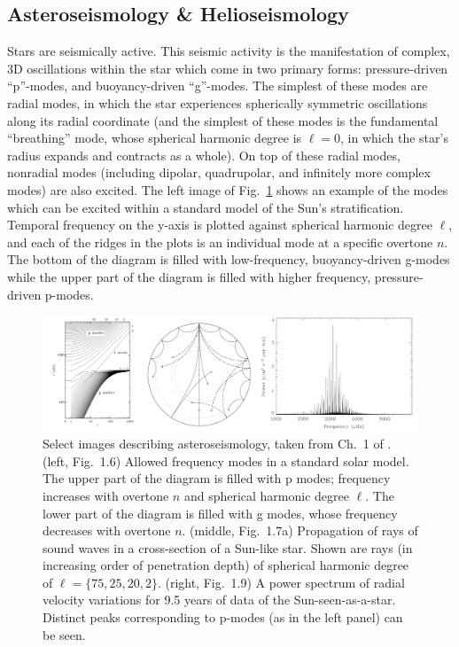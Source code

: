 \subsection{Asteroseismology \& Helioseismology}
\label{sct:asteroseismology}
Stars are seismically active.
This seismic activity is the manifestation of complex, 3D oscillations within the star which come in two primary forms: pressure-driven ``p''-modes, and buoyancy-driven ``g''-modes.
The simplest of these modes are radial modes, in which the star experiences spherically symmetric oscillations along its radial coordinate (and the simplest of these modes is the fundamental ``breathing'' mode, whose spherical harmonic degree is $\ell = 0$, in which the star's radius expands and contracts as a whole).
On top of these radial modes, nonradial modes (including dipolar, quadrupolar, and infinitely more complex modes) are also excited.
The left image of Fig.~\ref{fig:asteroseismology} shows an example of the modes which can be excited within a standard model of the Sun's stratification.
Temporal frequency on the y-axis is plotted against spherical harmonic degree $\ell$, and each of the ridges in the plots is an individual mode at a specific overtone $n$.
The bottom of the diagram is filled with low-frequency, buoyancy-driven g-modes while the upper part of the diagram is filled with higher frequency, pressure-driven p-modes.

\begin{figure}[t!]
\includegraphics[width=\textwidth]{./figs/intro/asteroseismology.pdf}
\caption[Introduction to Asteroseismology.]
{
	Select images describing asteroseismology, taken from Ch.~1 of \citet{aerts&all2010}.
	(left, Fig.~1.6) Allowed frequency modes in a standard solar model.
	The upper part of the diagram is filled with p modes; frequency increases with overtone $n$ and spherical harmonic degree $\ell$.
	The lower part of the diagram is filled with g modes, whose frequency decreases with overtone $n$.
	(middle, Fig.~1.7a) Propagation of rays of sound waves in a cross-section of a Sun-like star.
	Shown are rays (in increasing order of penetration depth) of spherical harmonic degree of $\ell = \{75, 25, 20, 2\}$.
	(right, Fig.~1.9) A power spectrum of radial velocity variations for 9.5 years of data of the Sun-seen-as-a-star.
	Distinct peaks corresponding to p-modes (as in the left panel) can be seen.
	\label{fig:asteroseismology} 
}
\end{figure}

